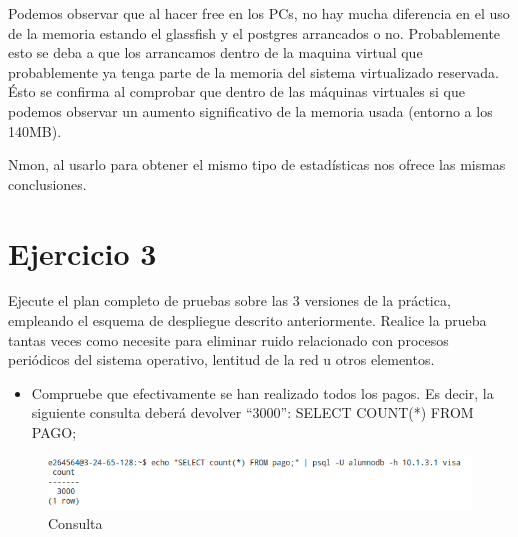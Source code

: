 \documentclass[a4paper, 10pt]{article}
\begin{document}
Podemos observar que al hacer free en los PCs, no hay mucha diferencia en el uso de la memoria estando el glassfish y el postgres arrancados o no. Probablemente esto se deba a que los arrancamos dentro de la maquina virtual que probablemente ya tenga parte de la memoria del sistema virtualizado reservada. Ésto se confirma al comprobar que dentro de las máquinas virtuales si que podemos observar un aumento significativo de la memoria usada (entorno a los 140MB).

Nmon, al usarlo para obtener el mismo tipo de estadísticas nos ofrece las mismas conclusiones.


\section{Ejercicio 3}
\begin{mdframed} 
Ejecute el plan completo de pruebas sobre las 3 versiones de la práctica, empleando el 
esquema de despliegue descrito anteriormente. Realice la prueba tantas veces como necesite para 
eliminar ruido relacionado con procesos periódicos del sistema operativo, lentitud de la red u otros 
elementos. 

\begin{itemize}
\item Compruebe que efectivamente se han realizado todos los pagos. Es decir, la siguiente 
consulta deberá devolver “3000”:
SELECT COUNT(*) FROM PAGO; 
\end{itemize}  
\end{mdframed}

\begin{figure}[hbtp]
	 	\centering
	 	\includegraphics[width=1.1\textwidth]{../../p2/pantallazos/ej3_select_count.png}
	 	\caption{Consulta}
\end{figure}
\end{document}
